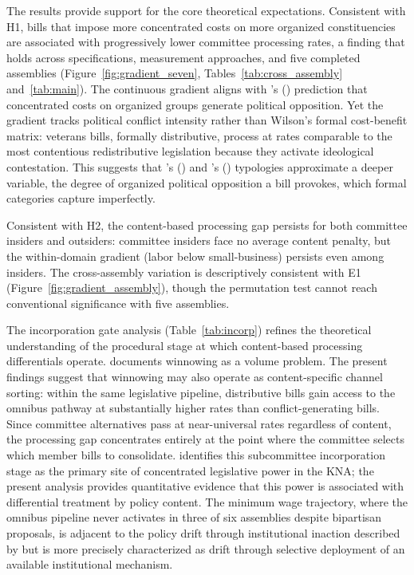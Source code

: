 \documentclass[11pt]{article}
\begin{document}
The results provide support for the core theoretical expectations. Consistent with H1, bills that impose more concentrated costs on more organized constituencies are associated with progressively lower committee processing rates, a finding that holds across specifications, measurement approaches, and five completed assemblies (Figure~\ref{fig:gradient_seven}, Tables~\ref{tab:cross_assembly} and~\ref{tab:main}). The continuous gradient aligns with \citeauthor{wilson1980}'s (\citeyear{wilson1980}) prediction that concentrated costs on organized groups generate political opposition. Yet the gradient tracks political conflict intensity rather than Wilson's formal cost-benefit matrix: veterans bills, formally distributive, process at rates comparable to the most contentious redistributive legislation because they activate ideological contestation. This suggests that \citeauthor{lowi1964}'s (\citeyear{lowi1964}) and \citeauthor{wilson1980}'s (\citeyear{wilson1980}) typologies approximate a deeper variable, the degree of organized political opposition a bill provokes, which formal categories capture imperfectly.

Consistent with H2, the content-based processing gap persists for both committee insiders and outsiders: committee insiders face no average content penalty, but the within-domain gradient (labor below small-business) persists even among insiders. The cross-assembly variation is descriptively consistent with E1 (Figure~\ref{fig:gradient_assembly}), though the permutation test cannot reach conventional significance with five assemblies.

The incorporation gate analysis (Table~\ref{tab:incorp}) refines the theoretical understanding of the procedural stage at which content-based processing differentials operate. \citet{krutz2005} documents winnowing as a volume problem. The present findings suggest that winnowing may also operate as content-specific channel sorting: within the same legislative pipeline, distributive bills gain access to the omnibus pathway at substantially higher rates than conflict-generating bills. Since committee alternatives pass at near-universal rates regardless of content, the processing gap concentrates entirely at the point where the committee selects which member bills to consolidate. \citet{park2026} identifies this subcommittee incorporation stage as the primary site of concentrated legislative power in the KNA; the present analysis provides quantitative evidence that this power is associated with differential treatment by policy content. The minimum wage trajectory, where the omnibus pipeline never activates in three of six assemblies despite bipartisan proposals, is adjacent to the policy drift through institutional inaction described by \citet{hacker2004} but is more precisely characterized as drift through selective deployment of an available institutional mechanism.
\end{document}
